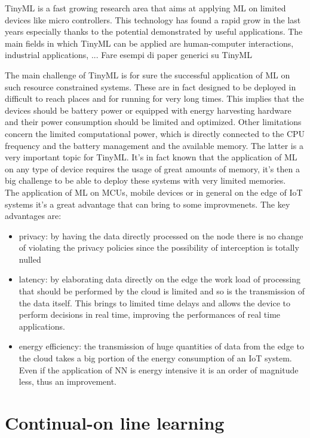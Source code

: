 \documentclass[12pt]{report}
\begin{document}
TinyML is a fast growing research area that aims at applying ML on limited devices like micro controllers. This technology has found a rapid grow in the last years especially thanks to the potential demonstrated by useful applications. The main fields in which TinyML can be applied are human-computer interactions, industrial applications, ... Fare esempi di paper generici su TinyML

The main challenge of TinyML is for sure the successful application of ML on such resource constrained systems. These are in fact designed to be deployed in difficult to reach places and for running for very long times. This implies that the devices should be battery power or equipped with energy harvesting hardware and their power consumption should be limited and optimized. Other limitations concern the limited computational power, which is directly connected to the CPU frequency and the battery management and the available memory. The latter is a very important topic for TinyML. It's in fact known that the application of ML on any type of device requires the usage of great amounts of memory, it's then a big challenge to be able to deploy these systems with very limited memories.\\
The application of ML on MCUs, mobile devices or in general on the edge of IoT systems it's a great advantage that can bring to some improvmenets. The key advantages are:
\begin{itemize}
\item privacy: by having the data directly processed on the node there is no change of violating the privacy policies since the possibility of interception is totally nulled
\item latency: by elaborating data directly on the edge the work load of processing that should be performed by the cloud is limited and so is the transmission of the data itself. This brings to limited time delays and allows the device to perform decisions in real time, improving the performances of real time applications.
\item energy efficiency: the transmission of huge quantities of data from the edge to the cloud takes a big portion of the energy consumption of an IoT system. Even if the application of NN is energy intensive it is an order of magnitude less, thus an improvement.
\end{itemize}


\section{Continual-on line learning}
\end{document}

